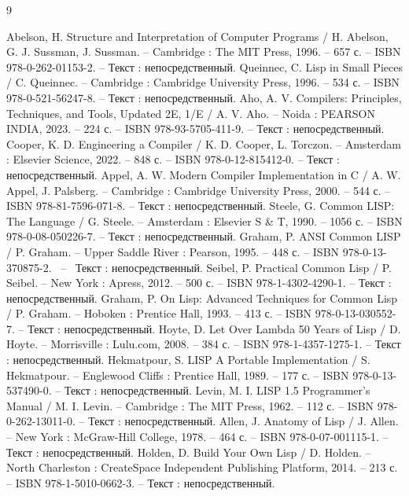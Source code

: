 
\begin{thebibliography}{9}

 Abelson, H. Structure and Interpretation of Computer Programs / H. Abelson, G. J. Sussman, J. Sussman. -- Cambridge : The MIT Press, 1996. -- 657 с. -- ISBN 978-0-262-01153-2. -- Текст : непосредственный.
 Queinnec, C. Lisp in Small Pieces / C. Queinnec. -- Cambridge : Cambridge University Press, 1996. -- 534 с. -- ISBN 978-0-521-56247-8. -- Текст : непосредственный.
 Aho, A. V. Compilers: Principles, Techniques, and Tools, Updated 2E, 1/E / A. V. Aho. -- Noida : PEARSON INDIA, 2023. -- 224 с. -- ISBN 978-93-5705-411-9. -- Текст : непосредственный.
 Cooper, K. D. Engineering a Compiler / K. D. Cooper, L. Torczon. -- Amsterdam : Elsevier Science, 2022. -- 848 с. -- ISBN 978-0-12-815412-0. -- Текст : непосредственный.
 Appel, A. W. Modern Compiler Implementation in C / A. W. Appel, J. Palsberg. -- Cambridge : Cambridge University Press, 2000. -- 544 с. -- ISBN 978-81-7596-071-8. -- Текст : непосредственный.
 Steele, G. Common LISP: The Language / G. Steele. -- Amsterdam : Elsevier S \& T, 1990. -- 1056 с. -- ISBN 978-0-08-050226-7. -- Текст : непосредственный.
 Graham, P. ANSI Common LISP / P. Graham. -- Upper Saddle River : Pearson, 1995. -- 448 с. -- ISBN 978-0-13-370875-2. ~-- ~Текст : непосредственный.
 Seibel, P. Practical Common Lisp / P. Seibel. -- New York : Apress, 2012. -- 500 с. -- ISBN 978-1-4302-4290-1. -- Текст : непосредственный.
 Graham, P. On Lisp: Advanced Techniques for Common Lisp / P. Graham. -- Hoboken : Prentice Hall, 1993. -- 413 с. -- ISBN 978-0-13-030552-7. -- Текст : непосредственный.
 Hoyte, D. Let Over Lambda 50 Years of Lisp / D. Hoyte. -- Morrisville : Lulu.com, 2008. -- 384 с. -- ISBN 978-1-4357-1275-1. -- Текст : непосредственный.
 Hekmatpour, S. LISP A Portable Implementation / S. Hekmatpour. -- Englewood Cliffs : Prentice Hall, 1989. -- 177 с. -- ISBN 978-0-13-537490-0. -- Текст : непосредственный.
 Levin, M. I. LISP 1.5 Programmer's Manual / M. I. Levin. -- Cambridge : The MIT Press, 1962. -- 112 с. -- ISBN 978-0-262-13011-0. -- Текст : непосредственный.
 Allen, J. Anatomy of Lisp / J. Allen. -- New York : McGraw-Hill College, 1978. -- 464 с. -- ISBN 978-0-07-001115-1. -- Текст : непосредственный.
 Holden, D. Build Your Own Lisp / D. Holden. -- North Charleston : CreateSpace Independent Publishing Platform, 2014. -- 213 с. -- ISBN 978-1-5010-0662-3. -- Текст : непосредственный.

\end{thebibliography}

